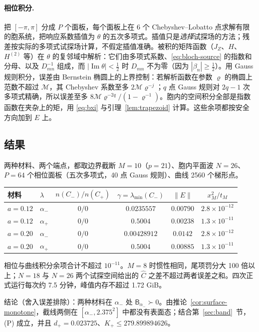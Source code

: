 \documentclass[11pt,a4paper,fontset=fandol]{ctexart}
\begin{document}
\paragraph{相位积分.} 把 $[-\pi,\pi]$ 分成 $P$ 个面板，每个面板上在 6 个 Chebyshev--Lobatto 点求解有限的胞系统，把响应系数插值为 $\theta$ 的五次多项式。插值只是\emph{选择}试探场的方法；残差按实际的多项式试探场计算，不假定插值准确。被积的矩阵函数（$J_Z$、$H$、$H^{(2)}$ 等）在 $\theta$ 的复邻域中解析：它们由多项式系数、\eqref{eq:bloch-source} 的指数和分母、以及 $D_{mn}^{-1}$ 组成，而 $|\operatorname{Im}\theta|<\tfrac12$ 时 $D_{mn}$ 不为零（因为 $|\beta_n|\ge\tfrac12$）。用 Gauss 规则积分，误差由 Bernstein 椭圆上的上界控制：若解析函数在参数 $\varrho$ 的椭圆上范数不超过 $\mathcal M$，其 Chebyshev 系数至多 $2\mathcal M\varrho^{-j}$；$q$ 点 Gauss 规则对 $2q-1$ 次多项式精确，所以误差至多 $8\mathcal M\varrho^{-2q}/(1-\varrho^{-1})$。胞内的空间积分全部是指数函数在夹杂上的矩，用 \eqref{eq:bxi} 与引理~\ref{lem:trapezoid} 计算。这些余项都按安全方向加到 $E$ 上。

\subsection{结果}

两种材料、两个端点，都取边界截断 $M=10$（$p=21$）、胞内平面波 $N=26$、$P=64$ 个相位面板（五次多项式，40 点 Gauss 规则）、曲线 2560 个梯形点。

\begin{center}
\small
\begin{tabular}{llcccc}
\toprule
材料 & $\lambda$ & $n(C_-)/n(C_+)$ & $\gamma=\lambda_{\min}(C_-)$ & $\|E\|$ & $x_M^2/t_M$ \\
\midrule
$a=0.12$ & $\alpha_-$ & $0/0$ & $0.0235557$ & $0.00790$ & $2.8\times10^{-12}$ \\
$a=0.12$ & $\alpha_+$ & $0/0$ & $0.5004$ & $0.00238$ & $1.3\times10^{-11}$ \\
$a=0.20$ & $\alpha_-$ & $0/0$ & $0.00428912$ & $0.0142$ & $2.8\times10^{-12}$ \\
$a=0.20$ & $\alpha_+$ & $0/0$ & $0.5004$ & $0.00885$ & $1.3\times10^{-11}$ \\
\bottomrule
\end{tabular}
\end{center}
相位与曲线积分余项合计不超过 $10^{-11}$。$M=8$ 时惯性相同，尾项罚分大 100 倍以上；$N=18$ 与 $N=26$ 两个试探空间给出的 $\hat C$ 之差不超过两者误差之和。四次正式运行每次约 7.5 分钟，峰值内存不超过 1.72 GiB。

结论（舍入误差排除）：两种材料在 $\alpha_-$ 处 $\mathsf B_{\alpha_-}\succ0$。由推论~\ref{cor:surface-monotone}，截线两侧在 $[\alpha_-,2.375^2]$ 中都没有表面态；结合第~\ref{sec:band}~节，(P) 成立，并且 $d_+=0.023725$、$K_+\le279.899894626$。
\end{document}
